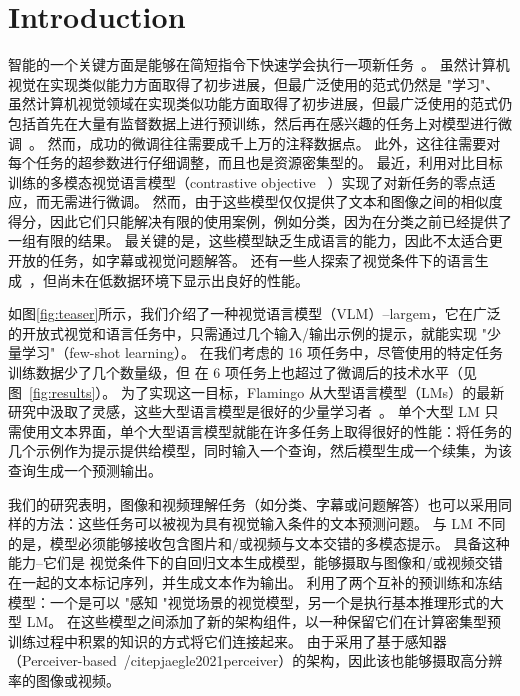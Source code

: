 \section{Introduction}
智能的一个关键方面是能够在简短指令下快速学会执行一项新任务~\citep{griffiths2019doing,markman1989categorization}。
虽然计算机视觉在实现类似能力方面取得了初步进展，但最广泛使用的范式仍然是 "学习"、
虽然计算机视觉领域在实现类似功能方面取得了初步进展，但最广泛使用的范式仍包括首先在大量有监督数据上进行预训练，然后再在感兴趣的任务上对模型进行微调~\citep{lu2019vilbert,wang2021ufo,zellers2022merlot}。
然而，成功的微调往往需要成千上万的注释数据点。
此外，这往往需要对每个任务的超参数进行仔细调整，而且也是资源密集型的。
最近，利用对比目标训练的多模态视觉语言模型（contrastive objective~\citep{align,clip} ）实现了对新任务的零点适应，而无需进行微调。
然而，由于这些模型仅仅提供了文本和图像之间的相似度得分，因此它们只能解决有限的使用案例，例如分类，因为在分类之前已经提供了一组有限的结果。
最关键的是，这些模型缺乏生成语言的能力，因此不太适合更开放的任务，如字幕或视觉问题解答。
还有一些人探索了视觉条件下的语言生成~\citep{wang2021simvlm,tsimpoukelli2021multimodal,cho2021unifying,wang2022unifying,xu2021vlm}，但尚未在低数据环境下显示出良好的性能。

如图\ref{fig:teaser}所示，我们介绍了一种视觉语言模型（VLM）--largem，它在广泛的开放式视觉和语言任务中，只需通过几个输入/输出示例的提示，就能实现 "少量学习"（few-shot learning）。
在我们考虑的 16 项任务中，尽管使用的特定任务训练数据少了几个数量级，但 \largem{}在 6 项任务上也超过了微调后的技术水平（见图~\ref{fig:results}）。
为了实现这一目标，Flamingo 从大型语言模型（LMs）的最新研究中汲取了灵感，这些大型语言模型是很好的少量学习者~\citep{gpt3,gopher,chinchilla,chowdhery2022palm}。
单个大型 LM
只需使用文本界面，单个大型语言模型就能在许多任务上取得很好的性能：将任务的几个示例作为提示提供给模型，同时输入一个查询，然后模型生成一个续集，为该查询生成一个预测输出。

我们的研究表明，图像和视频理解任务（如分类、字幕或问题解答）也可以采用同样的方法：这些任务可以被视为具有视觉输入条件的文本预测问题。
与 LM 不同的是，模型必须能够接收包含图片和/或视频与文本交错的多模态提示。
\methodfamily{}具备这种能力--它们是
视觉条件下的自回归文本生成模型，能够摄取与图像和/或视频交错在一起的文本标记序列，并生成文本作为输出。
\methodfamily{}利用了两个互补的预训练和冻结模型：一个是可以 "感知 "视觉场景的视觉模型，另一个是执行基本推理形式的大型 LM。
在这些模型之间添加了新的架构组件，以一种保留它们在计算密集型预训练过程中积累的知识的方式将它们连接起来。
由于采用了基于感知器\methodfamily{}（Perceiver-based~/citep{jaegle2021perceiver}）的架构，因此该\methodfamily{}也能够摄取高分辨率的图像或视频。


